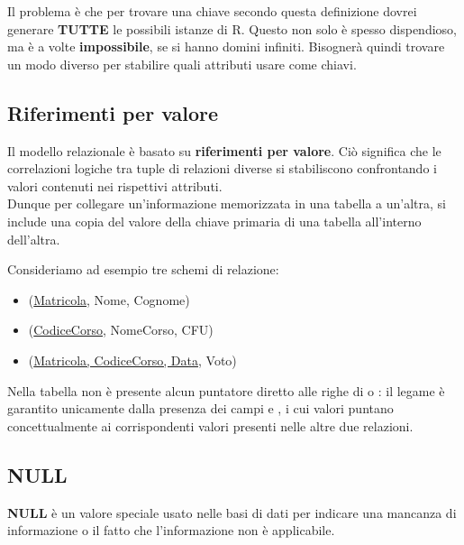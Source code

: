 \documentclass[11pt, a4paper, titlepage, oneside]{scrbook}
\begin{document}
Il problema è che per trovare una chiave secondo questa definizione dovrei generare \textbf{TUTTE} le possibili istanze di R. Questo non solo è spesso dispendioso, ma è a volte \textbf{impossibile}, se si hanno domini infiniti. Bisognerà quindi trovare un modo diverso per stabilire quali attributi usare come chiavi.

\subsection{Riferimenti per valore}

\begin{Definizione}
\label{def-riferimento-per-valore}
Il modello relazionale è basato su \textbf{riferimenti per valore}. Ciò significa che le correlazioni logiche tra tuple di relazioni diverse si stabiliscono confrontando i valori contenuti nei rispettivi attributi.
\\ Dunque per collegare un'informazione memorizzata in una tabella a un'altra, si include una copia del valore della chiave primaria di una tabella all'interno dell'altra.
\end{Definizione}

Consideriamo ad esempio tre schemi di relazione:
\begin{itemize}
    \item {}(\underline{Matricola}, Nome, Cognome)
    \item {}(\underline{CodiceCorso}, NomeCorso, CFU)
    \item {}(\underline{Matricola, CodiceCorso, Data}, Voto)
\end{itemize}
Nella tabella  non è presente alcun puntatore diretto alle righe di  o : il legame è garantito unicamente dalla presenza dei campi  e , i cui valori puntano concettualmente ai corrispondenti valori presenti nelle altre due relazioni.

\subsection{NULL}

\begin{Definizione}[NULL]
\label{def-NULL}
\textbf{NULL} è un valore speciale usato nelle basi di dati per indicare una mancanza di informazione o il fatto che l'informazione non è applicabile.
\end{Definizione}
\end{document}
